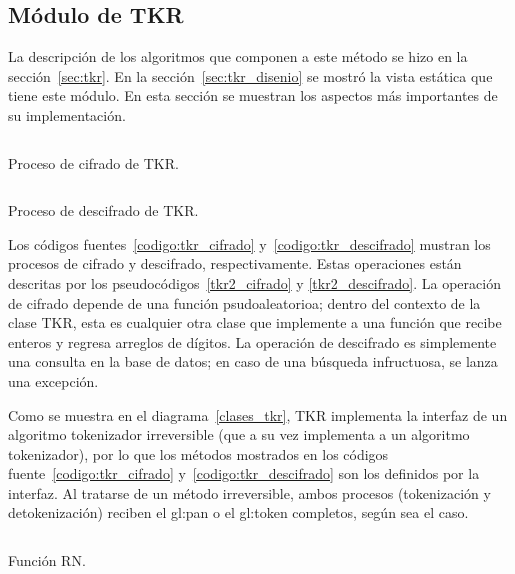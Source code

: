 %
%
%

\subsection{Módulo de TKR}

La descripción de los algoritmos que componen a este método se hizo en la
sección~\ref{sec:tkr}. En la sección~\ref{sec:tkr_disenio} se mostró la vista
estática que tiene este módulo. En esta sección se muestran los aspectos más
importantes de su implementación.

\begin{listing}
  \inputminted[firstline=41, lastline=69]
    {c++}{../implementaciones/tkr/tkr.cpp}
  \caption{Proceso de cifrado de TKR.}
  \label{codigo:tkr_cifrado}
\end{listing}

\begin{listing}
  \inputminted[firstline=71, lastline=86]
    {c++}{../implementaciones/tkr/tkr.cpp}
  \caption{Proceso de descifrado de TKR.}
  \label{codigo:tkr_descifrado}
\end{listing}

Los códigos fuentes~\ref{codigo:tkr_cifrado} y~\ref{codigo:tkr_descifrado}
mustran los procesos de cifrado y descifrado, respectivamente. Estas operaciones
están descritas por los pseudocódigos~\ref{tkr2_cifrado} y
\ref{tkr2_descifrado}. La operación de cifrado depende de una función
psudoaleatorioa; dentro del contexto de la clase TKR, esta es cualquier
otra clase que implemente a una función que recibe enteros y regresa
arreglos de dígitos. La operación de descifrado es simplemente una consulta
en la base de datos; en caso de una búsqueda infructuosa, se lanza una
excepción.

Como se muestra en el diagrama~\ref{clases_tkr}, TKR implementa la interfaz
de un algoritmo tokenizador irreversible (que a su vez implementa a un
algoritmo tokenizador), por lo que los métodos mostrados en los códigos
fuente~\ref{codigo:tkr_cifrado} y~\ref{codigo:tkr_descifrado} son
los definidos por la interfaz. Al tratarse de un método irreversible,
ambos procesos (tokenización y detokenización) reciben el \gls{gl:pan} o el
\gls{gl:token} completos, según sea el caso.

\begin{listing}
  \inputminted[firstline=53, lastline=75]
    {c++}{../implementaciones/tkr/funcion_rn.cpp}
  \caption{Función RN.}
  \label{codigo:funcion_rn}
\end{listing}

